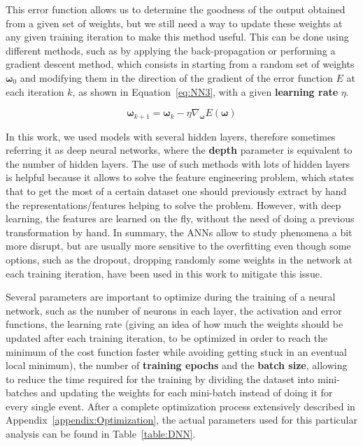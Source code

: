 \documentclass[a4paper, 10pt, openright]{report}
\begin{document}
This error function allows us to determine the goodness of the output obtained from a given set of weights, but we still need a way to update these weights at any given training iteration to make this method useful. This can be done using different methods, such as by applying the back-propagation or performing a gradient descent method, which consists in starting from a random set of weights $\bm \omega_0$ and modifying them in the direction of the gradient of the error function $E$ at each iteration $k$, as shown in Equation~\ref{eq:NN3}, with a given \textbf{learning rate} $\eta$. %

\begin{equation}
\label{eq:NN3}
\bm \omega_{k+1} = \bm \omega_k - \eta \nabla_{\bm \omega} E(\bm \omega)
\end{equation}

In this work, we used models with several hidden layers, therefore sometimes referring it as deep neural networks, where the \textbf{depth} parameter is equivalent to the number of hidden layers. The use of such methods with lots of hidden layers is helpful because it allows to solve the feature engineering problem, which states that to get the most of a certain dataset one should previously extract by hand the representations/features helping to solve the problem. However, with deep learning, the features are learned on the fly, without the need of doing a previous transformation by hand. In summary, the \acp{ANN} allow to study phenomena a bit more disrupt, but are usually more sensitive to the overfitting even though some options, such as the dropout, dropping randomly some weights in the network at each training iteration, have been used in this work to mitigate this issue. 

Several parameters are important to optimize during the training of a neural network, such as the number of neurons in each layer, the activation and error functions, the learning rate (giving an idea of how much the weights should be updated after each training iteration, to be optimized in order to reach the minimum of the cost function faster while avoiding getting stuck in an eventual local minimum), the number of \textbf{training epochs} and the \textbf{batch size}, allowing to reduce the time required for the training by dividing the dataset into mini-batches and updating the weights for each mini-batch instead of doing it for every single event. After a complete optimization process extensively described in Appendix~\ref{appendix:Optimization}, the actual parameters used for this particular analysis can be found in Table~\ref{table:DNN}.
\end{document}
